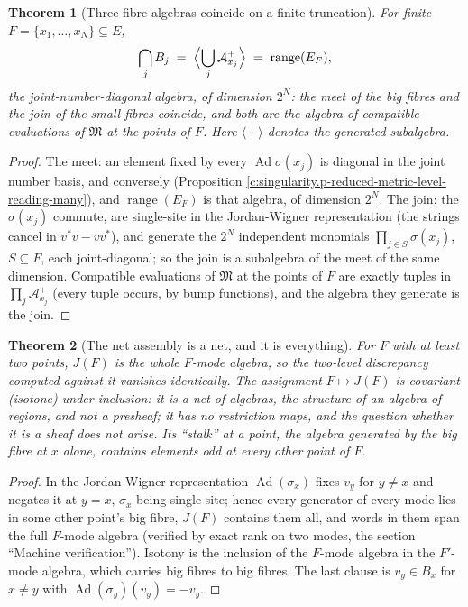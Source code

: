 \documentclass[11pt]{article}
\newtheorem{theorem}{Theorem}[section]
\theoremstyle{definition}
\theoremstyle{plain}
\providecommand{\Aa}{}\renewcommand{\Aa}{\mathcal{A}}
\begin{document}
\begin{theorem}[Three fibre algebras coincide on a finite truncation]\label{c:singularity.finite-truncation-meet-big-fibres-equals}
For finite $F = \{x_1, \dots, x_N\} \subseteq E$,
\[
\bigcap_{j} B_j \;=\; \Bigl\langle \bigcup_j \Aa_{x_j}^{+} \Bigr\rangle \;=\; \operatorname{range}(E_F),
\]
the joint-number-diagonal algebra, of dimension $2^N$: the meet of the big fibres and the join of the small fibres coincide, and both are the algebra of compatible evaluations of $\mathfrak{M}$ at the points of $F$. Here $\langle\,\cdot\,\rangle$ denotes the generated subalgebra.
\end{theorem}
\begin{proof}
The meet: an element fixed by every $\operatorname{Ad}\sigma(x_j)$ is diagonal in the joint number basis, and conversely (Proposition \ref{c:singularity.p-reduced-metric-level-reading-many}), and $\operatorname{range}(E_F)$ is that algebra, of dimension $2^N$. The join: the $\sigma(x_j)$ commute, are single-site in the Jordan-Wigner representation (the strings cancel in $v^{*}v - vv^{*}$), and generate the $2^N$ independent monomials $\prod_{j \in S}\sigma(x_j)$, $S \subseteq F$, each joint-diagonal; so the join is a subalgebra of the meet of the same dimension. Compatible evaluations of $\mathfrak{M}$ at the points of $F$ are exactly tuples in $\prod_j \Aa_{x_j}^{+}$ (every tuple occurs, by bump functions), and the algebra they generate is the join.

\end{proof}

\begin{theorem}[The net assembly is a net, and it is everything]\label{c:singularity.net-assembly-net-it-everything}
For $F$ with at least two points, $J(F)$ is the whole $F$-mode algebra, so the two-level discrepancy computed against it vanishes identically. The assignment $F \mapsto J(F)$ is covariant (isotone) under inclusion: it is a net of algebras, the structure of an algebra of regions, and not a presheaf; it has no restriction maps, and the question whether it is a sheaf does not arise. Its ``stalk'' at a point, the algebra generated by the big fibre at $x$ alone, contains elements odd at every other point of $F$.
\end{theorem}
\begin{proof}
In the Jordan-Wigner representation $\operatorname{Ad}(\sigma_x)$ fixes $v_y$ for $y \neq x$ and negates it at $y = x$, $\sigma_x$ being single-site; hence every generator of every mode lies in some other point's big fibre, $J(F)$ contains them all, and words in them span the full $F$-mode algebra (verified by exact rank on two modes, the section ``Machine verification''). Isotony is the inclusion of the $F$-mode algebra in the $F'$-mode algebra, which carries big fibres to big fibres. The last clause is $v_y \in B_x$ for $x \neq y$ with $\operatorname{Ad}(\sigma_y)(v_y) = -v_y$.

\end{proof}
\end{document}
